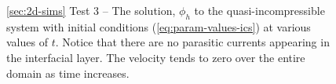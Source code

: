 \documentclass[final]{amsart}
\numberwithin{equation}{section}
\begin{document}
\begin{figure}[h]
  \caption[]
          {
            \label{fig:2d-solution-plot} 
            \ref{sec:2d-sims} Test 3 -- The solution, $\phi_h$ to the
            quasi-incompressible system with initial conditions
            (\ref{eq:param-values-ics}) at various values of
            $t$. Notice that there are no parasitic currents appearing
            in the interfacial layer. The velocity tends to zero over
            the entire domain as time increases. }
          \begin{center}
\end{center}
\end{figure}
\end{document}
